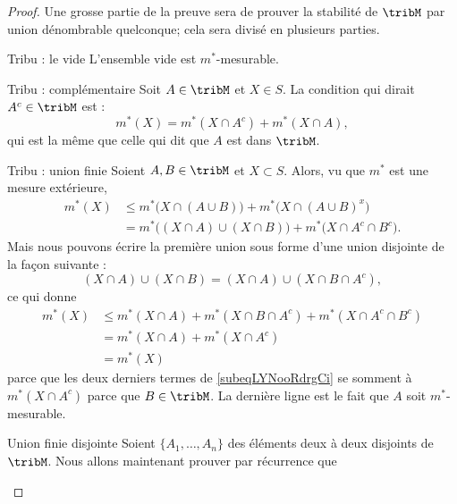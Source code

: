 \begin{proof}
    Une grosse partie de la preuve sera de prouver la stabilité de \( \tribM\) par union dénombrable quelconque; cela sera divisé en plusieurs parties.
    \begin{subproof}
    \item[Tribu : le vide]
        L'ensemble vide est \( m^*\)-mesurable.
    \item[Tribu : complémentaire]
        Soit \( A\in\tribM\) et \( X\in S\). La condition qui dirait \( A^c\in\tribM\) est :
        \begin{equation}
            m^*(X)=m^*(X\cap A^c)+m^*(X\cap A),
        \end{equation}
        qui est la même que celle qui dit que \( A\) est dans \( \tribM\).
    \item[Tribu : union finie]
        Soient \( A,B\in\tribM\) et \( X\subset S\). Alors, vu que \( m^*\) est une mesure extérieure,
        \begin{subequations}
            \begin{align}
                m^*(X)&\leq m^*\big( X\cap(A\cup B) \big)+m^*\big( X\cap (A\cup B)^x \big)\\
                &=m^*\big( (X\cap A)\cup(X\cap B) \big)+m^*\big( X\cap A^c\cap B^c \big).
            \end{align}
        \end{subequations}
        Mais nous pouvons écrire la première union sous forme d'une union disjointe de la façon suivante :
        \begin{equation}
            (X\cap A)\cup(X\cap B)=(X\cap A)\cup(X\cap B\cap A^c),
        \end{equation}
        ce qui donne
        \begin{subequations}
            \begin{align}
                m^*(X)&\leq m^*(X\cap A)+m^*(X\cap B\cap A^c)+m^*(X\cap A^c\cap B^c)        \label{subeqLYNooRdrgCi}\\
                &=m^*(X\cap A)+m^*(X\cap A^c)\\
                &=m^*(X)
            \end{align}
        \end{subequations}
        parce que les deux derniers termes de \eqref{subeqLYNooRdrgCi} se somment à \( m^*(X\cap A^c)\) parce que \( B\in \tribM\). La dernière ligne est le fait que \( A\) soit \( m^*\)-mesurable.
    \item[Union finie disjointe]
        Soient \( \{ A_1,\ldots, A_n \}\) des éléments deux à deux disjoints de \( \tribM\). Nous allons maintenant prouver par récurrence que

\end{subproof}
\end{proof}
